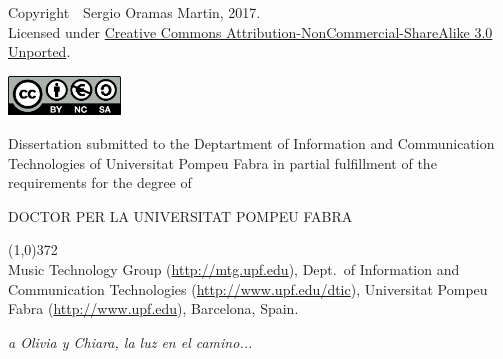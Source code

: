 \cleartorecto
\thispagestyle{empty}

{\footnotesize Copyright~\textcopyright~Sergio Oramas Martin, 2017.}
\\{\footnotesize Licensed under \href{http://creativecommons.org/licenses/by-nc-sa/3.0/}{Creative Commons Attribution-NonCommercial-ShareAlike 3.0 Unported}.}

\href{http://creativecommons.org/licenses/by-nc-sa/3.0/}{\includegraphics[width=3cm]{ch00_pics/creative-commons2.png}}


\vspace*{5cm}


Dissertation submitted to the Deptartment of Information and Communication Technologies of Universitat Pompeu Fabra in partial fulfillment of the requirements for the degree of

\vspace*{0.5cm}

\centerline{DOCTOR PER LA UNIVERSITAT POMPEU FABRA}

\vspace*{0.6cm}



\vspace*{\fill}

\line(1,0){372}\\
\footnotesize
Music Technology Group (\url{http://mtg.upf.edu}), Dept.~of Information and Communication Technologies (\url{http://www.upf.edu/dtic}), Universitat Pompeu Fabra (\url{http://www.upf.edu}), Barcelona, Spain.
\normalsize


\cleartorecto



\cleartorecto
\thispagestyle{empty}
\vspace*{3cm}
\begin{flushright}
\textit{a Olivia y Chiara, la luz en el camino...}
\end{flushright}


